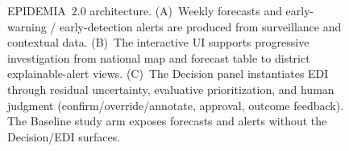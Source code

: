 \begin{figure}[t]
\caption{EPIDEMIA~2.0 architecture. (A)~Weekly forecasts and early-warning / early-detection alerts are produced from surveillance and contextual data. (B)~The interactive UI supports progressive investigation from national map and forecast table to district explainable-alert views. (C)~The Decision panel instantiates EDI through residual uncertainty, evaluative prioritization, and human judgment (confirm/override/annotate, approval, outcome feedback). The Baseline study arm exposes forecasts and alerts without the Decision/EDI surfaces.}
\label{fig:system-architecture}
\end{figure}
